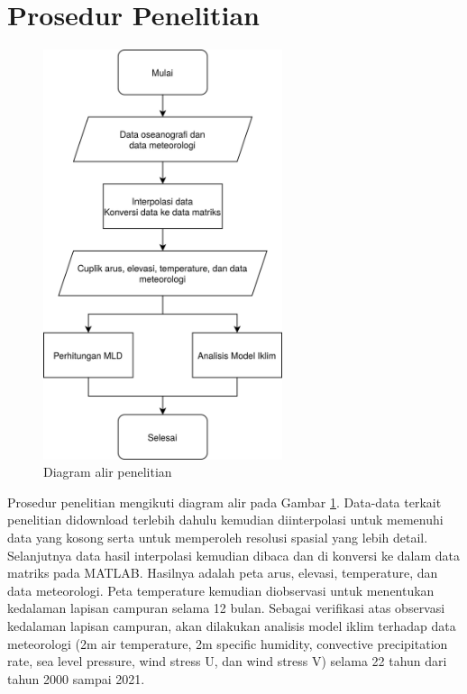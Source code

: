 \vspace{-0.5pc}
\section[Prosedur Penelitian]{Prosedur Penelitian}
\begin{spacing}{1.5}
	\begin{figure}[H]
		\centering
		\includegraphics[width=7cm]{contents/flowchart.png}
		\caption{Diagram alir penelitian}
		\label{fig:flowchart}
	\end{figure}
	Prosedur penelitian mengikuti diagram alir pada Gambar \ref{fig:flowchart}. Data-data terkait penelitian didownload terlebih dahulu kemudian diinterpolasi untuk memenuhi data yang kosong serta untuk memperoleh resolusi spasial yang lebih detail. Selanjutnya data hasil interpolasi kemudian dibaca dan di konversi ke dalam data matriks pada MATLAB. Hasilnya adalah peta arus, elevasi, temperature, dan data meteorologi. Peta temperature kemudian diobservasi untuk menentukan kedalaman lapisan campuran selama 12 bulan. Sebagai verifikasi atas observasi kedalaman lapisan campuran, akan dilakukan analisis model iklim terhadap data meteorologi (2m air temperature, 2m specific humidity, convective precipitation rate, sea level pressure, wind stress U, dan wind stress V) selama 22 tahun dari tahun 2000 sampai 2021.
\end{spacing}